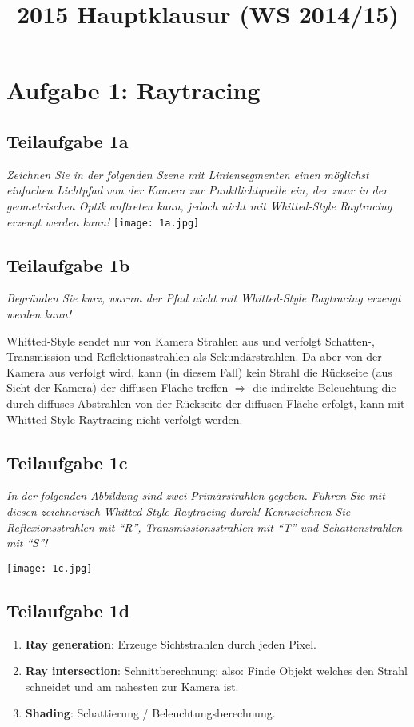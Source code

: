 \documentclass[a4paper]{scrartcl}
\begin{document}
\title{2015 Hauptklausur (WS 2014/15)}

\setcounter{section}{1}
\section*{Aufgabe 1: Raytracing}
\subsection*{Teilaufgabe 1a}
\textit{Zeichnen Sie in der folgenden Szene mit Liniensegmenten einen möglichst einfachen
Lichtpfad von der Kamera zur Punktlichtquelle ein, der zwar in der geometrischen
Optik auftreten kann, jedoch nicht mit Whitted-Style Raytracing erzeugt werden kann!}
\texttt{[image: 1a.jpg]}

\subsection*{Teilaufgabe 1b}
\textit{Begründen Sie kurz, warum der Pfad nicht mit Whitted-Style Raytracing
erzeugt werden kann!}

Whitted-Style sendet nur von Kamera Strahlen aus und verfolgt Schatten-,
Transmission und Reflektionsstrahlen als Sekundärstrahlen. Da aber von der
Kamera aus verfolgt wird, kann (in diesem Fall) kein Strahl die Rückseite (aus
Sicht der Kamera) der diffusen Fläche treffen $\Rightarrow$ die indirekte
Beleuchtung die durch diffuses Abstrahlen von der Rückseite der diffusen Fläche
erfolgt, kann mit Whitted-Style Raytracing nicht verfolgt werden.

\subsection*{Teilaufgabe 1c}
\textit{In der folgenden Abbildung sind zwei Primärstrahlen gegeben. Führen Sie
mit diesen zeichnerisch Whitted-Style Raytracing durch! Kennzeichnen Sie
Reflexionsstrahlen mit \enquote{R}, Transmissionsstrahlen mit \enquote{T} und
Schattenstrahlen mit \enquote{S}!}

\texttt{[image: 1c.jpg]}

\subsection*{Teilaufgabe 1d}
\begin{enumerate}
    \item \textbf{Ray generation}: Erzeuge Sichtstrahlen durch jeden Pixel.
    \item \textbf{Ray intersection}: Schnittberechnung; also: Finde Objekt
          welches den Strahl schneidet und am nahesten zur Kamera ist.
    \item \textbf{Shading}: Schattierung / Beleuchtungsberechnung.
\end{enumerate}
\end{document}
